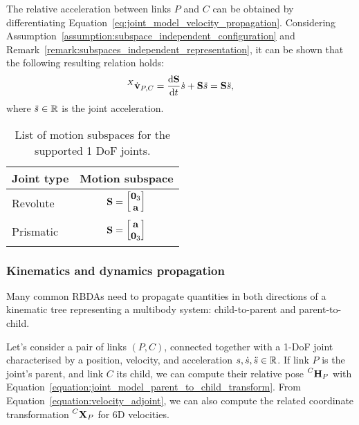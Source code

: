 The relative acceleration between links $P$ and $C$ can be obtained by differentiating Equation~\eqref{eq:joint_model_velocity_propagation}.
Considering Assumption~\ref{assumption:subspace_independent_configuration} and Remark~\ref{remark:subspaces_independent_representation}, it can be shown that the following resulting relation holds:
%
\begin{equation}
    \label{eq:joint_model_acceleration_propagation}
    \velsixd[X]_{P,C} 
    = \dv{\subspace}{t} \dot{\shape} + \subspace \ddot{\shape}
    = \subspace \ddot{\shape}
    ,
\end{equation}
%
where $\ddot{s} \in \realn$ is the joint acceleration.

\begin{table}
    \centering
    \begin{tabular}{lc}
        Joint type & Motion subspace \\
        \hline\hline
        \addlinespace[1mm]
        Revolute & $\subspace = \begin{bmatrix}\zeros_3 \\ \mathbf{a}\end{bmatrix}$ \\
        \addlinespace[1mm]
        Prismatic & $\subspace = \begin{bmatrix}\mathbf{a} \\ \zeros_3 \end{bmatrix}$
    \end{tabular}
    \caption{List of motion subspaces for the supported 1 \ac{DoF} joints.}
    \label{tab:motion_subspaces}
\end{table}

\subsubsection{Kinematics and dynamics propagation}
\label{sec:joint_kin_dyn_propagation}

Many common \acp{RBDA} need to propagate quantities in both directions of a kinematic tree representing a multibody system: child-to-parent and parent-to-child.

Let's consider a pair of links $(P, C)$, connected together with a 1-\ac{DoF} joint characterised by a position, velocity, and acceleration $\shape, \dot{\shape}, \ddot{\shape} \in \realn$.
If link $P$ is the joint's parent, and link $C$ its child, we can compute their relative pose $\homo[C]_P$ with Equation~\eqref{equation:joint_model_parent_to_child_transform}.
From Equation~\eqref{equation:velocity_adjoint}, we can also compute the related coordinate transformation $\transvel[C]_P$ for 6D velocities.

